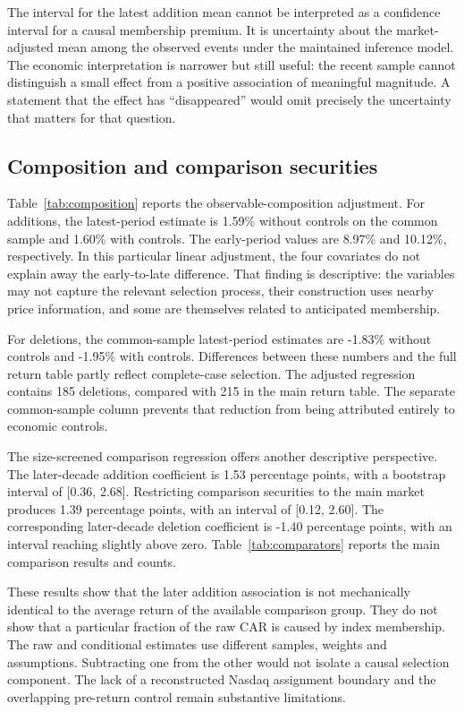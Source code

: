 The interval for the latest addition mean cannot be interpreted as a confidence interval for a causal membership premium. It is uncertainty about the market-adjusted mean among the observed events under the maintained inference model. The economic interpretation is narrower but still useful: the recent sample cannot distinguish a small effect from a positive association of meaningful magnitude. A statement that the effect has ``disappeared'' would omit precisely the uncertainty that matters for that question.

\subsection{Composition and comparison securities}

Table~\ref{tab:composition} reports the observable-composition adjustment. For additions, the latest-period estimate is 1.59\% without controls on the common sample and 1.60\% with controls. The early-period values are 8.97\% and 10.12\%, respectively. In this particular linear adjustment, the four covariates do not explain away the early-to-late difference. That finding is descriptive: the variables may not capture the relevant selection process, their construction uses nearby price information, and some are themselves related to anticipated membership.



For deletions, the common-sample latest-period estimates are -1.83\% without controls and -1.95\% with controls. Differences between these numbers and the full return table partly reflect complete-case selection. The adjusted regression contains 185 deletions, compared with 215 in the main return table. The separate common-sample column prevents that reduction from being attributed entirely to economic controls.

The size-screened comparison regression offers another descriptive perspective. The later-decade addition coefficient is 1.53 percentage points, with a bootstrap interval of [0.36, 2.68]. Restricting comparison securities to the main market produces 1.39 percentage points, with an interval of [0.12, 2.60]. The corresponding later-decade deletion coefficient is -1.40 percentage points, with an interval reaching slightly above zero. Table~\ref{tab:comparators} reports the main comparison results and counts.



These results show that the later addition association is not mechanically identical to the average return of the available comparison group. They do not show that a particular fraction of the raw CAR is caused by index membership. The raw and conditional estimates use different samples, weights and assumptions. Subtracting one from the other would not isolate a causal selection component. The lack of a reconstructed Nasdaq assignment boundary and the overlapping pre-return control remain substantive limitations.

\FloatBarrier
